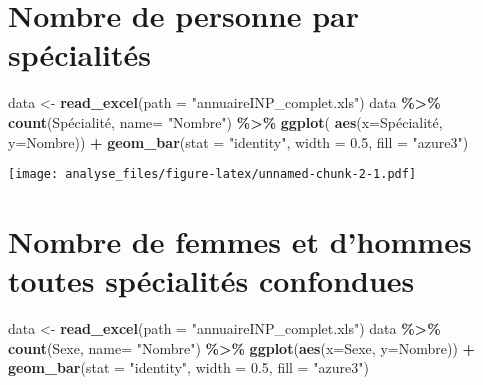 \documentclass[
]{article}
\newenvironment{Shaded}{\begin{snugshade}}{\end{snugshade}}
\newcommand{\DataTypeTok}[1]{\textcolor[rgb]{0.13,0.29,0.53}{#1}}
\newcommand{\FloatTok}[1]{\textcolor[rgb]{0.00,0.00,0.81}{#1}}
\newcommand{\KeywordTok}[1]{\textcolor[rgb]{0.13,0.29,0.53}{\textbf{#1}}}
\newcommand{\NormalTok}[1]{#1}
\newcommand{\OperatorTok}[1]{\textcolor[rgb]{0.81,0.36,0.00}{\textbf{#1}}}
\newcommand{\StringTok}[1]{\textcolor[rgb]{0.31,0.60,0.02}{#1}}
\begin{document}
\hypertarget{nombre-de-personne-par-spuxe9cialituxe9s}{%
\section{Nombre de personne par
spécialités}\label{nombre-de-personne-par-spuxe9cialituxe9s}}

\begin{Shaded}
\begin{Highlighting}[]
\NormalTok{data \textless{}{-}}\StringTok{ }\KeywordTok{read\_excel}\NormalTok{(}\DataTypeTok{path =} \StringTok{"annuaireINP\_complet.xls"}\NormalTok{)}
\NormalTok{data }\OperatorTok{\%\textgreater{}\%}
\StringTok{  }\KeywordTok{count}\NormalTok{(Spécialité, }\DataTypeTok{name=} \StringTok{"Nombre"}\NormalTok{) }\OperatorTok{\%\textgreater{}\%}
\StringTok{  }\KeywordTok{ggplot}\NormalTok{( }\KeywordTok{aes}\NormalTok{(}\DataTypeTok{x=}\NormalTok{Spécialité, }\DataTypeTok{y=}\NormalTok{Nombre)) }\OperatorTok{+}
\StringTok{  }\KeywordTok{geom\_bar}\NormalTok{(}\DataTypeTok{stat =} \StringTok{"identity"}\NormalTok{, }\DataTypeTok{width =} \FloatTok{0.5}\NormalTok{, }\DataTypeTok{fill =} \StringTok{"azure3"}\NormalTok{)}
\end{Highlighting}
\end{Shaded}

\texttt{[image: analyse\_files/figure-latex/unnamed-chunk-2-1.pdf]}

\hypertarget{nombre-de-femmes-et-dhommes-toutes-spuxe9cialituxe9s-confondues}{%
\section{Nombre de femmes et d'hommes toutes spécialités
confondues}\label{nombre-de-femmes-et-dhommes-toutes-spuxe9cialituxe9s-confondues}}

\begin{Shaded}
\begin{Highlighting}[]
\NormalTok{data \textless{}{-}}\StringTok{ }\KeywordTok{read\_excel}\NormalTok{(}\DataTypeTok{path =} \StringTok{"annuaireINP\_complet.xls"}\NormalTok{)}
\NormalTok{data }\OperatorTok{\%\textgreater{}\%}\StringTok{ }
\StringTok{  }\KeywordTok{count}\NormalTok{(Sexe, }\DataTypeTok{name=} \StringTok{"Nombre"}\NormalTok{) }\OperatorTok{\%\textgreater{}\%}
\StringTok{  }\KeywordTok{ggplot}\NormalTok{(}\KeywordTok{aes}\NormalTok{(}\DataTypeTok{x=}\NormalTok{Sexe, }\DataTypeTok{y=}\NormalTok{Nombre)) }\OperatorTok{+}
\StringTok{  }\KeywordTok{geom\_bar}\NormalTok{(}\DataTypeTok{stat =} \StringTok{"identity"}\NormalTok{, }\DataTypeTok{width =} \FloatTok{0.5}\NormalTok{, }\DataTypeTok{fill =} \StringTok{"azure3"}\NormalTok{)}
\end{Highlighting}
\end{Shaded}
\end{document}
